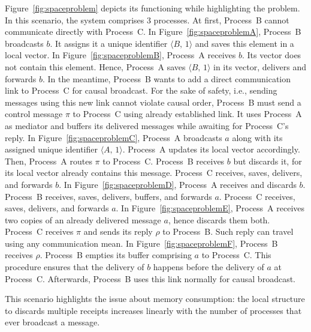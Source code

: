 Figure~\ref{fig:spaceproblem} depicts its functioning while highlighting the
problem. In this scenario, the system comprises 3 processes. At first, Process~B
cannot communicate directly with Process~C. In Figure~\ref{fig:spaceproblemA},
Process~B broadcasts $b$. It assigns it a unique identifier
$\langle B,\, 1 \rangle$ and saves this element in a local vector. In
Figure~\ref{fig:spaceproblemB}, Process~A receives $b$. Its vector does not
contain this element. Hence, Process~A saves $\langle B,\,1\rangle$ in its
vector, delivers and forwards $b$. In the meantime, Process~B wants to add a
direct communication link to Process~C for causal broadcast. For the sake of
safety, i.e., sending messages using this new link cannot violate causal order,
Process~B must send a control message $\pi$ to Process~C using already
established link. It uses Process~A as mediator and buffers its delivered
messages while awaiting for Process~C's reply. In
Figure~\ref{fig:spaceproblemC}, Process~A broadcasts $a$ along with its assigned
unique identifier $\langle A,\, 1 \rangle$. Process~A updates its local vector
accordingly. Then, Process~A routes $\pi$ to Process~C. Process~B receives $b$
but discards it, for its local vector already contains this message.  Process~C
receives, saves, delivers, and forwards $b$. In Figure~\ref{fig:spaceproblemD},
Process~A receives and discards $b$. Process~B receives, saves, delivers,
buffers, and forwards $a$. Process~C receives, saves, delivers, and forwards
$a$. In Figure~\ref{fig:spaceproblemE}, Process~A receives two copies of an
already delivered message $a$, hence discards them both. Process~C receives
$\pi$ and sends its reply $\rho$ to Process~B. Such reply can travel using any
communication mean. In Figure~\ref{fig:spaceproblemF}, Process~B receives
$\rho$. Process~B empties its buffer comprising $a$ to Process~C. This procedure
ensures that the delivery of $b$ happens before the delivery of $a$ at
Process~C. Afterwards, Process~B uses this link normally for causal broadcast.

This scenario highlights the issue about memory consumption: the local structure
to discards multiple receipts increases linearly with the number of processes
that ever broadcast a message.

